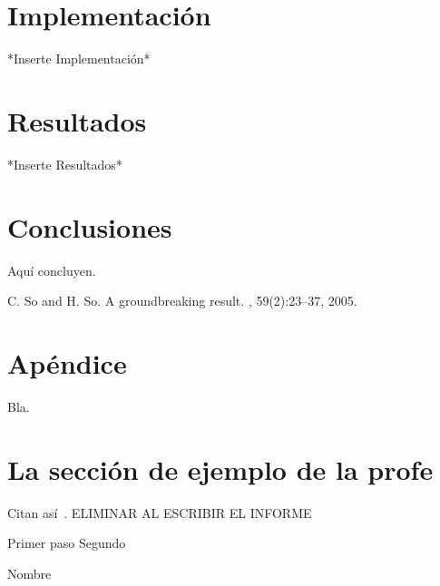 \documentclass{ci5652}
\begin{document}
\section{Implementación}
*Inserte Implementación*

\section{Resultados}
*Inserte Resultados*

\section*{Conclusiones}

Aquí concluyen.


\small


\begin{thebibliography}{99}

C. So and H. So.
\newblock A groundbreaking result.
, 59(2):23--37, 2005.

\end{thebibliography}


\newpage
\section*{Apéndice}

Bla.


\section{La sección de ejemplo de la profe}
Citan así~\cite{so2005}. ELIMINAR AL ESCRIBIR EL INFORME

\begin{algorithm}
 \DontPrintSemicolon
 \vspace*{0.1cm}
 Primer paso\;
 Segundo\;
 \vspace*{0.1cm}
 \caption{Nombre}
\end{algorithm}
\end{document}
